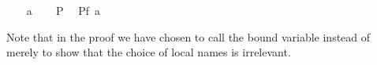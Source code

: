 \begin{isabellebody}
{}
\isanewline
\ \ \isamarkupfalse%
\ a\isanewline
\ \ \isamarkupfalse%
\ P\ \isamarkupfalse%
\ {\isachardoublequote}P{\isacharparenleft}f\ a{\isacharparenright}{\isachardoublequote}\ \isamarkupfalse%
\isacommand{{\isachardot}{\isachardot}}\ \ %
\isanewline
\isamarkupfalse%
%
\endisatagproof
{\isafoldproof}%
%
\isadelimproof
%
\endisadelimproof
\isamarkuptrue%
%
\begin{isamarkuptext}%
\noindent Note that in the proof we have chosen to call the bound
variable  instead of  merely to show that the choice of
local names is irrelevant.


\end{isamarkuptext}
\end{isabellebody}

